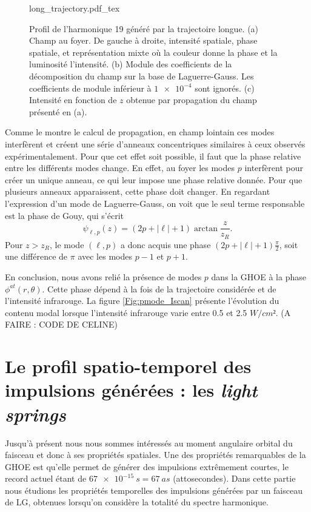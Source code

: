 \begin{figure}[!ht]
\centering
\def\svgwidth{\columnwidth}
{long_trajectory.pdf_tex}
\caption{Profil de l'harmonique 19 généré par la trajectoire longue. (a) Champ au foyer. De gauche à droite, intensité spatiale, phase spatiale, et représentation mixte où la couleur donne la phase et la luminosité l'intensité. (b) Module des coefficients de la décomposition du champ sur la base de Laguerre-Gauss. Les coefficients de module inférieur à $\num{1e-4}$ sont ignorés. (c) Intensité en fonction de $z$ obtenue par propagation du champ présenté en (a).}
\label{Fig:DecompLong}
\end{figure}

Comme le montre le calcul de propagation, en champ lointain ces modes interfèrent et créent une série d'anneaux concentriques similaires à ceux observés expérimentalement. Pour que cet effet soit possible, il faut que la phase relative entre les différents modes change. En effet, au foyer les modes $p$ interfèrent pour créer un unique anneau, ce qui leur impose une phase relative donnée. Pour que plusieurs anneaux apparaissent, cette phase doit changer. En regardant l'expression d'un mode de Laguerre-Gauss, on voit que le seul terme responsable est la phase de Gouy, qui s'écrit
\begin{equation*}
\psi _{\ell ,p}(z)=(2p+\left|\ell\right|+1)\arctan{\frac{z}{z_R}}.
\end{equation*}
Pour $z>z_R$, le mode $(\ell,p)$ a donc acquis une phase $(2p+\left|\ell\right|+1)\frac{\pi}{2}$, soit une différence de $\pi$ avec les modes $p-1$ et $p+1$. 

En conclusion, nous avons relié la présence de modes $p$ dans la GHOE à la phase $\phi^{at}(r,\theta)$. Cette phase dépend à la fois de la trajectoire considérée et de l'intensité infrarouge. La figure \ref{Fig:pmode_Iscan} présente l'évolution du contenu modal lorsque l'intensité infrarouge varie entre 0.5 et 2.5 $\si{W/cm²}$. (A FAIRE : CODE DE CELINE)

\chapter{Le profil spatio-temporel des impulsions générées : les \textit{light springs}}
Jusqu'à présent nous nous sommes intéressés au moment angulaire orbital du faisceau et donc à ses propriétés spatiales. Une des propriétés remarquables de la GHOE est qu'elle permet de générer des impulsions extrêmement courtes, le record actuel étant de $\SI{67e-15}{s}=\SI{67}{as}$ (attosecondes). Dans cette partie nous étudions les propriétés temporelles des impulsions générées par un faisceau de LG, obtenues lorsqu'on considère la totalité du spectre harmonique.

